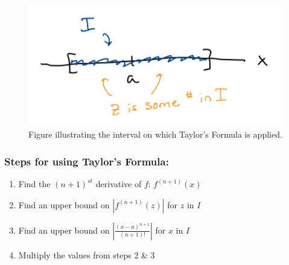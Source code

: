 
\begin{figure}[!h]

\includegraphics[width=1.05\textwidth]{Ch6s4-Error-Interval.png}
\caption{Figure illustrating the interval on which Taylor's Formula is applied.}
\end{figure}
\subsubsection*{Steps for using Taylor's Formula:} 
\begin{enumerate}
\item Find the \((n+1)^{st}\) derivative of \(f\): \(f^{(n+1)}(x)\)
\item Find an upper bound on \(|f^{(n+1)}(z)|\) for \(z\) in \(I\)
\item Find an upper bound on \(\left|\frac{(x-a)^{n+1}}{(n+1)!}\right|\) for \(x\) in \(I\)
\item Multiply the values from steps 2 \& 3 %
\end{enumerate}




